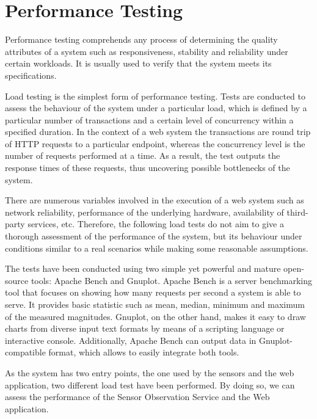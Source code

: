 \chapter{Performance Testing}

Performance testing comprehends any process of determining the quality attributes of a system such as responsiveness, stability and reliability under certain workloads. It is usually used to verify that the system meets its specifications.

Load testing is the simplest form of performance testing. Tests are conducted to assess the behaviour of the system under a particular load, which is defined by a particular number of transactions and a certain level of concurrency within a specified duration. In the context of a web system the transactions are round trip of HTTP requests to a particular endpoint, whereas the concurrency level is the number of requests performed at a time. As a result, the test outputs the response times of these requests, thus uncovering possible bottlenecks of the system.

There are numerous variables involved in the execution of a web system such as network reliability, performance of the underlying hardware, availability of third-party services, etc. Therefore, the following load tests do not aim to give a thorough assessment of the performance of the system, but its behaviour under conditions similar to a real scenarios while making some reasonable assumptions.

The tests have been conducted using two simple yet powerful and mature open-source tools: Apache Bench and Gnuplot. Apache Bench is a server benchmarking tool that focuses on showing how many requests per second a system is able to serve. It provides basic statistic such as mean, median, minimum and maximum of the measured magnitudes. Gnuplot, on the other hand, makes it easy to draw charts from diverse input text formats by means of a scripting language or interactive console. Additionally, Apache Bench can output data in Gnuplot-compatible format, which allows to easily integrate both tools.

As the system has two entry points, the one used by the sensors and the web application, two different load test have been performed. By doing so, we can assess the performance of the Sensor Observation Service and the Web application.

